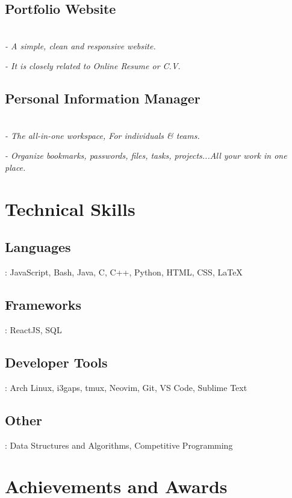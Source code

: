 \documentclass[a4paper,11pt]{article}
\begin{document}
\subsection{Portfolio Website}

\textsl{\\- A simple, clean and responsive website.}

{\hspace{-1.5em}}\textsl{- It is closely related to Online Resume or C.V.}

\subsection{Personal Information Manager}

\textsl{\\- The all-in-one workspace, For individuals \& teams.}

\hspace{-1.5em}\textsl{- Organize bookmarks, passwords, files, tasks, projects...All your work in one place.}

\vspace{-1.1em}

\section{Technical Skills}
\subsection{Languages}: JavaScript, Bash, Java, C, C++, Python, HTML, CSS, \LaTeX
\subsection{Frameworks}: ReactJS, SQL
\subsection{Developer Tools}: Arch Linux, i3gaps, tmux, Neovim, Git, VS Code, Sublime Text
\subsection{Other}: Data Structures and Algorithms, Competitive Programming

\vspace{-1.1em}

\section{Achievements and Awards}
\end{document}
